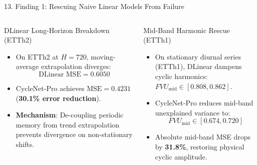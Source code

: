 \documentclass[aspectratio=169, 10pt]{beamer}
\begin{document}
\begin{frame}{13. Finding 1: Rescuing Naive Linear Models From Failure}
\begin{columns}[T]
\begin{alertblock}{DLinear Long-Horizon Breakdown (ETTh2)}
\begin{itemize}
    \item On ETTh2 at $H=720$, moving-average extrapolation diverges:
    $$\text{DLinear MSE} = \mathbf{0.6050}$$
    \item CycleNet-Pro achieves $\text{MSE} = \mathbf{0.4231}$ (\textbf{30.1\% error reduction}).
    \item \textbf{Mechanism}: De-coupling periodic memory from trend extrapolation prevents divergence on non-stationary shifts.
\end{itemize}
\end{alertblock}

\begin{exampleblock}{Mid-Band Harmonic Rescue (ETTh1)}
\begin{itemize}
    \item On stationary diurnal series (ETTh1), DLinear dampens cyclic harmonics: $FVU_{\text{mid}} \in [0.808, 0.862]$.
    \item CycleNet-Pro reduces mid-band unexplained variance to:
    $$FVU_{\text{mid}} \in [\mathbf{0.674}, \mathbf{0.720}]$$
    \item Absolute mid-band MSE drops by \textbf{31.8\%}, restoring physical cyclic amplitude.
\end{itemize}
\end{exampleblock}
\end{columns}
\end{frame}
\end{document}
